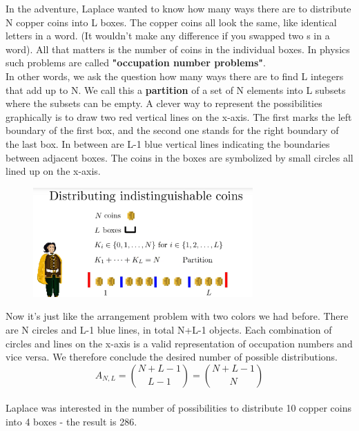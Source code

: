 \documentclass[12pt, a4paper]{scrartcl}
\begin{document}
In the adventure, Laplace wanted to know how many ways there are to distribute N copper coins into L boxes.
The copper coins all look the same, like identical letters in a word. (It wouldn’t make any difference if you swapped two s in a word).
All that matters is the number of coins in the individual boxes. In physics such problems are called \textbf{"occupation number problems"}.\\

In other words, we ask the question how many ways there are to find L integers that add up to N. We call this a \textbf{partition} of a set of N elements into L subsets where the subsets can be empty.
A clever way to represent the possibilities graphically is to draw two red vertical lines on the x-axis. The first marks the left boundary of the first box, and the second one stands for the right boundary of the last box.
In between are L-1 blue vertical lines indicating the boundaries between adjacent boxes.
The coins in the boxes are symbolized by small circles all lined up on the x-axis.
 \begin{figure}[H]
	\centering
	\includegraphics[width=0.75\textwidth]{4_12.png}
\end{figure}
Now it’s just like the arrangement problem with two colors we had before. There are N circles and L-1 blue lines, in total N+L-1 objects. Each combination of circles and lines on the x-axis is a valid representation of occupation numbers and vice versa. We therefore conclude the desired number of possible distributions.\\
\begin{equation*}\boxed{A_{N,L}={N+L-1\choose L-1}={N+L-1\choose N}
}\end{equation*}\\
Laplace was interested in the number of possibilities to distribute 10 copper coins into 4 boxes - the result is 286.\\
 
\end{document}
